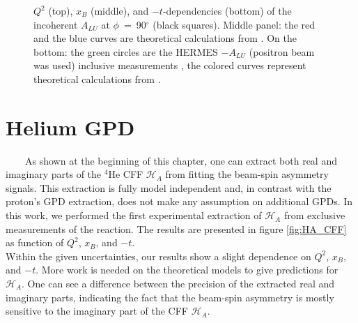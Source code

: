 \begin{figure}[tpb]
{   $Q^{2}$ (top), $x_{B}$ (middle), and $-t$-dependencies (bottom) of the 
   incoherent $A_{LU}$ at $\phi$~=~90$^{\circ}$ (black squares). Middle panel: 
   the red and the blue curves are theoretical calculations from 
   \cite{simonetta_2}. On the bottom: the green circles are the HERMES 
   $-A_{LU}$ (positron beam was used) inclusive measurements \cite{HERMES_BSA}, 
   the colored curves represent theoretical calculations from 
\cite{simonetta_2}.  } \label{fig:incoh_Q2_xB_t_ALU}
\end{figure}


\section{Helium GPD}
~~~~As shown at the beginning of this chapter, one can extract both real and
imaginary parts of the 
$^4$He CFF $\mathcal{H}_A$ from fitting the beam-spin asymmetry signals. This extraction
is fully model independent and, in contrast with the proton's GPD extraction, does not
make any assumption on additional GPDs. In this 
work, we performed the first experimental extraction of $\mathcal{H}_A$ from 
exclusive measurements of the reaction. The results are presented in figure 
\ref{fig:HA_CFF} as function of $Q^{2}$, $x_B$, and $-t$.\\

Within the given uncertainties, our results show a slight dependence on 
$Q^{2}$, $x_B$, and $-t$.  More work is needed on the theoretical models to 
give predictions for $\mathcal{H}_A$.  One can see a difference between the 
precision of the extracted real and imaginary parts, indicating the fact that 
the beam-spin asymmetry is mostly sensitive to the imaginary part of the  CFF 
$\mathcal{H}_A$.

